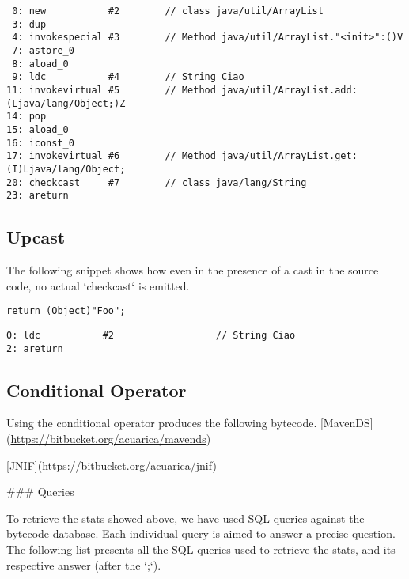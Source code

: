 \begin{verbatim}
 0: new           #2        // class java/util/ArrayList 
 3: dup 
 4: invokespecial #3        // Method java/util/ArrayList."<init>":()V 
 7: astore_0 
 8: aload_0 
 9: ldc           #4        // String Ciao 
11: invokevirtual #5        // Method java/util/ArrayList.add:(Ljava/lang/Object;)Z 
14: pop 
15: aload_0 
16: iconst_0 
17: invokevirtual #6        // Method java/util/ArrayList.get:(I)Ljava/lang/Object; 
20: checkcast     #7        // class java/lang/String 
23: areturn 
\end{verbatim}

\subsection{Upcast}
\label{sec:orgdc8750a}

The following snippet shows how even in the presence of a cast in the source code, 
no actual `checkcast` is emitted. 

\lstset{language=java,label= ,caption= ,captionpos=b,numbers=none}
\begin{lstlisting}
return (Object)"Foo"; 
\end{lstlisting}

\begin{verbatim}
0: ldc           #2                  // String Ciao 
2: areturn 
\end{verbatim}

\subsection{Conditional Operator}
\label{sec:orgbeee934}

Using the conditional operator produces the following bytecode. 
[MavenDS](\url{https://bitbucket.org/acuarica/mavends}) 

[JNIF](\url{https://bitbucket.org/acuarica/jnif}) 

\#\#\# Queries 

To retrieve the stats showed above, 
we have used SQL queries against the bytecode database. 
Each individual query is aimed to answer a precise question. 
The following list presents all the SQL queries used to retrieve the stats, 
and its respective answer (after the `;`). 

